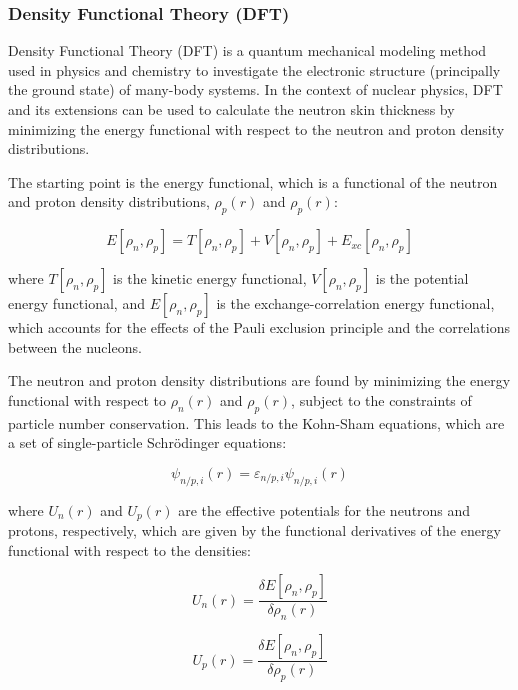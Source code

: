 \subsubsection{Density Functional Theory (DFT)}

Density Functional Theory (DFT) is a quantum mechanical modeling method used in physics and chemistry to investigate the electronic structure (principally the ground state) of many-body systems. In the context of nuclear physics, DFT and its extensions can be used to calculate the neutron skin thickness by minimizing the energy functional with respect to the neutron and proton density distributions.

The starting point is the energy functional, which is a functional of the neutron and proton density distributions, $\rho_p(r)$ and $\rho_p(r)$:

\begin{equation}
    E[\rho_n,\rho_p] = T[\rho_n,\rho_p] + V[\rho_n,\rho_p] + E_{xc}[\rho_n,\rho_p]
\end{equation}

where $T[\rho_n,\rho_p]$ is the kinetic energy functional, $V[\rho_n,\rho_p]$ is the potential energy functional, and $E[\rho_n,\rho_p]$ is the exchange-correlation energy functional, which accounts for the effects of the Pauli exclusion principle and the correlations between the nucleons.

The neutron and proton density distributions are found by minimizing the energy functional with respect to $\rho_n(r)$ and $\rho_p(r)$, subject to the constraints of particle number conservation. This leads to the Kohn-Sham equations, which are a set of single-particle Schrödinger equations:

\begin{equation}
     [-\frac{\hbar^2}{2m}\nabla^2 + U_{n/p}(r)]\psi_{n/p,i}(r) = \varepsilon_{n/p,i}\psi_{n/p,i}(r)
\end{equation}

where $U_n(r)$ and $U_p(r)$ are the effective potentials for the neutrons and protons, respectively, which are given by the functional derivatives of the energy functional with respect to the densities:

\begin{equation}
    U_n(r) = \frac{\delta{E[\rho_n,\rho_p]}}{\delta{\rho_n(r)}}
\end{equation}

\begin{equation}
    U_p(r) = \frac{\delta{E[\rho_n,\rho_p]}}{\delta{\rho_p(r)}}
\end{equation}

